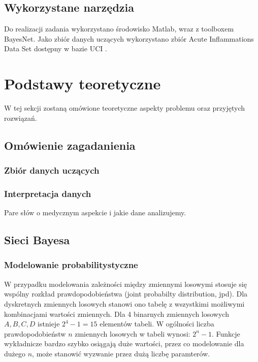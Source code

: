 \documentclass{article}
\begin{document}
\subsection{Wykorzystane narzędzia}
Do realizacji zadania wykorzystano środowisko Matlab, wraz z toolboxem BayesNet. Jako zbiór danych uczących wykorzystano zbiór Acute Inflammations Data Set dostępny w bazie UCI \cite{data set}.

\section{Podstawy teoretyczne}
W tej sekcji zostaną omówione teoretyczne aspekty problemu oraz przyjętych rozwiązań.

\subsection{Omówienie zagadanienia}

\subsubsection{Zbiór danych uczących}


\subsubsection{Interpretacja danych}
Pare słów o medycznym aspekcie i jakie dane analizujemy.

\subsection{Sieci Bayesa}

\subsubsection{Modelowanie probabilitystyczne}
W przypadku modelowania zależności między zmiennymi losowymi stosuje się wspólny rozkład prawdopodobieństwa (joint probabilty distribution, jpd). Dla dyskretnych zmiennych losowych stanowi ono tabelę z wszystkimi możliwymi kombinacjami wartości zmiennych. Dla 4 binarnych zmiennych losowych $A, B, C, D$ istnieje $2^4-1 = 15$ elementów tabeli. W ogólności liczba prawdopodobieństw $n$ zmiennych losowych w tabeli wynosi: $2^n - 1$. Funkcje wykładnicze bardzo szybko osiągają duże wartości, przez co modelowanie dla dużego $n$, może stanowić wyzwanie przez dużą liczbę paramterów.
\end{document}
